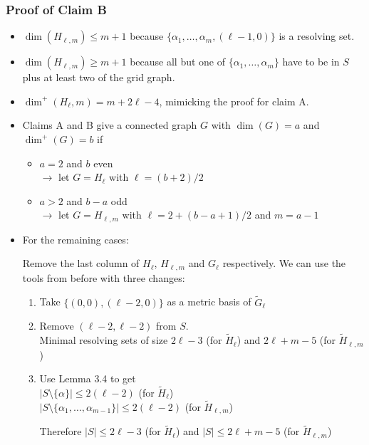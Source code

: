 \documentclass[hyperref={pdfpagelabels=false}]{beamer}
\theoremstyle{definition}
\theoremstyle{theorem}
\begin{document}
\begin{frame}
	\frametitle{Proof of Claim B}
	\begin{itemize}
		\item $\dim(H_{\ell,m}) \leq m+1$ because $\{\alpha_1, \dotsc, \alpha_m, (\ell-1,0)\}$ is a resolving set.
		\item $\dim(H_{\ell,m}) \geq m+1$ because all but one of $\{\alpha_1,\dotsc,\alpha_m\}$ have to be in $S$ plus at least two of the grid graph.
		\item $\dim^+(H_\ell,m) = m + 2\ell - 4$, mimicking the proof for claim A.
	\end{itemize}
\end{frame}
\begin{frame}
	\begin{itemize}
		\item Claims A and B give a connected graph $G$ with $\dim(G) = a$ and $\dim^+(G) = b$ if 
			\begin{itemize}
				\item $a=2$ and $b$ even\\
					$\rightarrow$ let $G=H_\ell$ with $\ell = (b+2)/2$
				\item $a>2$ and $b-a$ odd\\
					$\rightarrow$ let $G=H_{\ell,m}$ with $\ell = 2+(b-a+1)/2$ and $m=a-1$
			\end{itemize}
		\item For the remaining cases:

			Remove the last column of $H_\ell$, $H_{\ell,m}$ and $G_\ell$ respectively. We can use the tools from before with three changes:
			\begin{enumerate}
				\item Take $\{(0,0),(\ell-2,0)\}$ as a metric basis of $\tilde G_\ell$
				\item Remove $(\ell-2,\ell-2)$ from $S$.\\
					Minimal resolving sets of size $2\ell-3$ (for $\tilde H_\ell$) and $2\ell+m-5$ (for $\tilde H_{\ell,m}$)
				\item Use Lemma 3.4 to get\\
					$|S \setminus \{\alpha\}| \leq 2(\ell - 2)$ (for $\tilde H_\ell$)\\
					$|S \setminus \{\alpha_1,\dotsc,\alpha_{m-1}\}| \leq 2(\ell - 2)$ (for $\tilde H_{\ell,m}$)

					Therefore $|S| \leq 2\ell - 3$ (for $\tilde H_\ell$) and $|S| \leq 2\ell + m - 5$ (for $\tilde H_{\ell,m}$)
			\end{enumerate}
	\end{itemize}
\end{frame}
\end{document}
